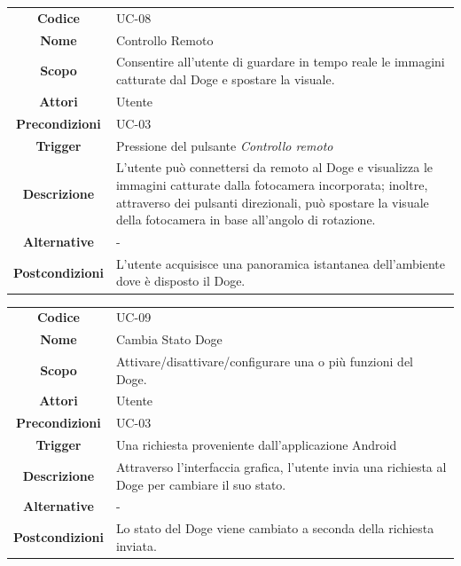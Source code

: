 \documentclass{article}
\begin{document}
\begin{adjustbox}{center}
\begin{tabular}{|c|p{10cm}|}
\hline
\textbf{Codice} & UC-08 \\
\textbf{Nome} & Controllo Remoto \\
\textbf{Scopo} & Consentire all'utente di guardare in tempo reale le immagini catturate dal Doge e spostare la visuale. \\
\textbf{Attori} & Utente \\
\textbf{Precondizioni} & UC-03 \\
\textbf{Trigger} & Pressione del pulsante \emph{Controllo remoto} \\
\textbf{Descrizione} & L'utente può connettersi da remoto al Doge e visualizza le immagini catturate dalla fotocamera incorporata; inoltre, attraverso dei pulsanti
direzionali, può spostare la visuale della fotocamera in base all'angolo
di rotazione. \\
\textbf{Alternative} & - \\
\textbf{Postcondizioni} & L'utente acquisisce una panoramica istantanea dell'ambiente dove è disposto il Doge. \\
\hline
\end{tabular}
\end{adjustbox}

\begin{adjustbox}{center}
\begin{tabular}{|c|p{10cm}|}
\hline
\textbf{Codice} & UC-09 \\
\textbf{Nome} & Cambia Stato Doge \\
\textbf{Scopo} & Attivare/disattivare/configurare una o più funzioni del Doge. \\
\textbf{Attori} & Utente \\
\textbf{Precondizioni} & UC-03 \\
\textbf{Trigger} & Una richiesta proveniente dall'applicazione Android \\
\textbf{Descrizione} & Attraverso l'interfaccia grafica, l'utente invia una richiesta al Doge per cambiare il suo stato. \\
\textbf{Alternative} & - \\
\textbf{Postcondizioni} & Lo stato del Doge viene cambiato a seconda della richiesta inviata. \\
\hline
\end{tabular}
\end{adjustbox}
\end{document}
